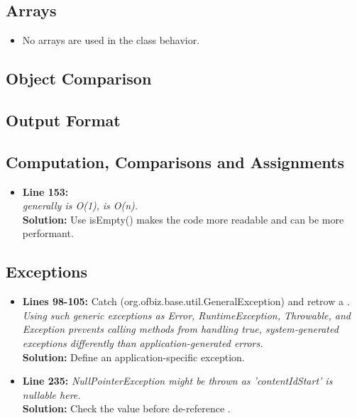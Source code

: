 \subsection{Arrays}
\begin{itemize}
	\item No arrays are used in the class behavior.
\end{itemize}

\subsection{Object Comparison}

\subsection{Output Format}

\subsection{Computation, Comparisons and Assignments}
\begin{itemize}
	\item \textbf{Line 153:}\\
\textit{ generally is O(1),}  \textit{is O(n).}\\
	\textbf{Solution:}	Use isEmpty() makes the code more readable and can be more performant. \\
	 
\end{itemize}

\subsection{Exceptions}
\begin{itemize}
\item \textbf{Lines 98-105:}
Catch  (org.ofbiz.base.util.GeneralException) and retrow a .\\
\textit{Using such generic exceptions as Error, RuntimeException, Throwable, and Exception prevents calling methods from handling true, system-generated exceptions differently than application-generated errors.}\\
\textbf{Solution:} Define an application-specific exception.

\item \textbf{Line 235:} 
\textit{NullPointerException might be thrown as 'contentIdStart' is nullable here.}\\
\textbf{Solution: }Check the  value before de-reference .
\end{itemize}

